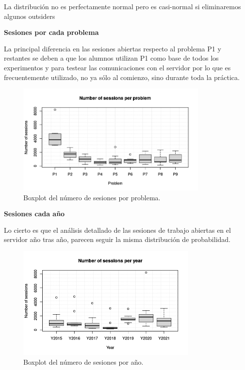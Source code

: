 La distribución no es perfectamente normal pero es casi-normal si eliminaremos algunos outsiders

\textbf{Sesiones por cada problema}

La principal diferencia en las sesiones abiertas respecto al problema P1 y restantes se deben a que los alumnos utilizan P1 como base de todos los experimentos y para testear las comunicaciones con el servidor por lo que es frecuentemente utilizado, no ya sólo al comienzo, sino durante toda la práctica.

\begin{figure}[H]
    \centering
    \includegraphics[width=0.85\textwidth]{imagenes/allsessions/Rplot06.png}
    \caption{Boxplot del número de sesiones por problema.}
    \label{fig:boxplotsessionsproblem}
\end{figure}


\textbf{Sesiones cada año}

Lo cierto  es que el análisis detallado de las sesiones de trabajo abiertas en el servidor año tras año, parecen seguir la misma distribución de probabilidad.

\begin{figure}[H]
    \centering
    \includegraphics[width=0.80\textwidth]{imagenes/allsessions/Rplot07.png}
    \caption{Boxplot del número de sesiones por año.}
    \label{fig:boxplotsessionsproblem}
\end{figure}

